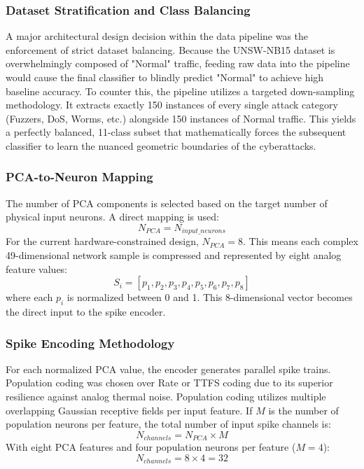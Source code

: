 \documentclass{ieeeaccess}
\begin{document}
\subsubsection{Dataset Stratification and Class Balancing}
A major architectural design decision within the data pipeline was the enforcement of strict dataset balancing. Because the UNSW-NB15 dataset is overwhelmingly composed of "Normal" traffic, feeding raw data into the pipeline would cause the final classifier to blindly predict "Normal" to achieve high baseline accuracy. To counter this, the pipeline utilizes a targeted down-sampling methodology. It extracts exactly 150 instances of every single attack category (Fuzzers, DoS, Worms, etc.) alongside 150 instances of Normal traffic. This yields a perfectly balanced, 11-class subset that mathematically forces the subsequent classifier to learn the nuanced geometric boundaries of the cyberattacks.

\subsubsection{PCA-to-Neuron Mapping}

The number of PCA components is selected based on the target number of physical input neurons. A direct mapping is used:
\begin{equation}
N_{PCA} = N_{input\_neurons}
\end{equation}
For the current hardware-constrained design, $N_{PCA}=8$. This means each complex 49-dimensional network sample is compressed and represented by eight analog feature values:
\begin{equation}
S_i = [p_1, p_2, p_3, p_4, p_5, p_6, p_7, p_8]
\end{equation}
where each $p_i$ is normalized between 0 and 1. This 8-dimensional vector becomes the direct input to the spike encoder.

\subsubsection{Spike Encoding Methodology}

For each normalized PCA value, the encoder generates parallel spike trains. Population coding was chosen over Rate or TTFS coding due to its superior resilience against analog thermal noise. Population coding utilizes multiple overlapping Gaussian receptive fields per input feature. If $M$ is the number of population neurons per feature, the total number of input spike channels is:
\begin{equation}
N_{channels} = N_{PCA} \times M
\end{equation}
With eight PCA features and four population neurons per feature ($M=4$):
\begin{equation}
N_{channels} = 8 \times 4 = 32
\end{equation}
\end{document}
